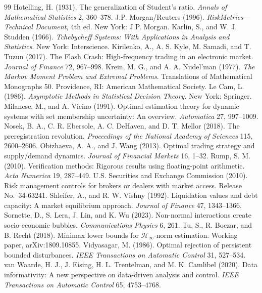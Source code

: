 \begin{thebibliography}{99}
 Hotelling, H. (1931). The generalization of Student's ratio. \emph{Annals of Mathematical Statistics} 2, 360--378.
 J.P. Morgan/Reuters (1996). \emph{RiskMetrics---Technical Document}, 4th ed. New York: J.P. Morgan.
 Karlin, S., and W. J. Studden (1966). \emph{Tchebycheff Systems: With Applications in Analysis and Statistics}. New York: Interscience.
 Kirilenko, A., A. S. Kyle, M. Samadi, and T. Tuzun (2017). The Flash Crash: High-frequency trading in an electronic market. \emph{Journal of Finance} 72, 967--998.
 Krein, M. G., and A. A. Nudel'man (1977). \emph{The Markov Moment Problem and Extremal Problems}. Translations of Mathematical Monographs 50. Providence, RI: American Mathematical Society.
 Le Cam, L. (1986). \emph{Asymptotic Methods in Statistical Decision Theory}. New York: Springer.
 Milanese, M., and A. Vicino (1991). Optimal estimation theory for dynamic systems with set membership uncertainty: An overview. \emph{Automatica} 27, 997--1009.
 Nosek, B. A., C. R. Ebersole, A. C. DeHaven, and D. T. Mellor (2018). The preregistration revolution. \emph{Proceedings of the National Academy of Sciences} 115, 2600--2606.
 Obizhaeva, A. A., and J. Wang (2013). Optimal trading strategy and supply/demand dynamics. \emph{Journal of Financial Markets} 16, 1--32.
 Rump, S. M. (2010). Verification methods: Rigorous results using floating-point arithmetic. \emph{Acta Numerica} 19, 287--449.
 U.S. Securities and Exchange Commission (2010). Risk management controls for brokers or dealers with market access. Release No.\ 34-63241.
 Shleifer, A., and R. W. Vishny (1992). Liquidation values and debt capacity: A market equilibrium approach. \emph{Journal of Finance} 47, 1343--1366.
 Sornette, D., S. Lera, J. Lin, and K. Wu (2023). Non-normal interactions create socio-economic bubbles. \emph{Communications Physics} 6, 261.
 Tu, S., R. Boczar, and B. Recht (2018). Minimax lower bounds for $\mathcal H_\infty$-norm estimation. Working paper, arXiv:1809.10855.
 Vidyasagar, M. (1986). Optimal rejection of persistent bounded disturbances. \emph{IEEE Transactions on Automatic Control} 31, 527--534.
 van Waarde, H. J., J. Eising, H. L. Trentelman, and M. K. Camlibel (2020). Data informativity: A new perspective on data-driven analysis and control. \emph{IEEE Transactions on Automatic Control} 65, 4753--4768.
\end{thebibliography}

